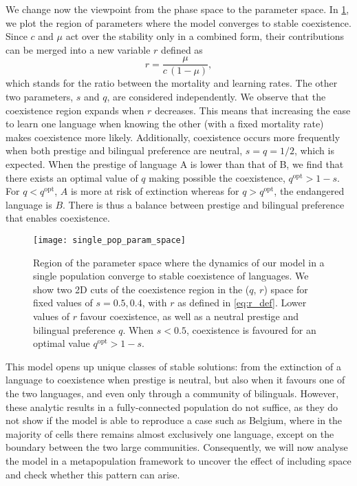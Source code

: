 \documentclass[../thesis.tex]{subfiles}
\begin{document}
We change now the viewpoint from the phase space to the parameter space. In
\cref{fig:coex_region}, we plot the region of parameters where the model converges to
stable coexistence. Since $c$ and $\mu$ act over the stability only in a combined form,
their contributions can be merged into a new variable $r$ defined as
\begin{equation}
  \label{eq:r_def}
  r = \frac{\mu}{c \,(1-\mu)},
\end{equation}
which stands for the ratio between the mortality and learning rates. The
other two parameters, $s$ and $q$, are considered independently. We observe that the
coexistence region expands when $r$ decreases. This means that increasing the ease to
learn one language when knowing the other (with a fixed mortality rate) makes
coexistence more likely. Additionally, coexistence occurs more frequently when both
prestige and bilingual preference are neutral, $s = q = 1/2$, which is expected. When
the prestige of language A is lower than that of B, we find that there exists an optimal
value of $q$ making possible the coexistence, $q^\text{opt} > 1-s$. For $q <
q^\text{opt}$, $A$ is more at risk of extinction whereas for $q > q^\text{opt}$, the
endangered language is $B$. There is thus a balance between prestige and bilingual
preference that enables coexistence.
\begin{figure}[h]
  \centering
  \texttt{[image: single\_pop\_param\_space]}
  \caption{Region of the parameter space where the dynamics of our model in a single
  population converge to stable coexistence of languages. We show two 2D cuts of the
  coexistence region in the ($q$, $r$) space for fixed values of $s=0.5, 0.4$, with $r$
  as defined in \cref{eq:r_def}. Lower values of $r$ favour coexistence, as well as a
  neutral prestige and bilingual preference $q$. When $s < 0.5$, coexistence is favoured
  for an optimal value $q^\text{opt} > 1-s$.}
  \label{fig:coex_region}
\end{figure}

This model opens up unique classes of stable solutions: from the extinction of a
language to coexistence when prestige is neutral, but also when it favours one of the
two languages, and even only through a community of bilinguals. However, these analytic
results in a fully-connected population do not suffice, as they do not show if the model
is able to reproduce a case such as Belgium, where in the majority of cells there
remains almost exclusively one language, except on the boundary between the two large
communities. Consequently, we will now analyse the model in a metapopulation framework
to uncover the effect of including space and check whether this pattern can arise.
\end{document}
